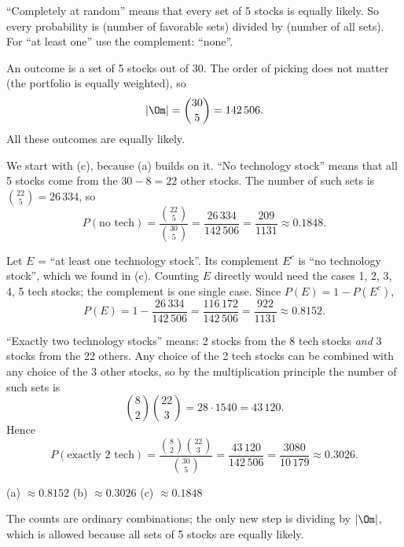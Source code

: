 \begin{solution}
	\idea ``Completely at random'' means that every set of 5 stocks is equally
	likely. So every probability is (number of favorable sets) divided by
	(number of all sets). For ``at least one'' use the complement: ``none''.

	 An outcome is a set of 5 stocks out of 30. The order of
	picking does not matter (the portfolio is equally weighted), so
	\[ |\Om|=\binom{30}{5}=142\,506. \]
	All these outcomes are equally likely.

	 We start with (c), because (a) builds on it. ``No technology
	stock'' means that all 5 stocks come from the $30-8=22$ other stocks. The
	number of such sets is $\binom{22}{5}=26\,334$, so
	\[ P(\text{no tech})=\frac{\binom{22}{5}}{\binom{30}{5}}
		=\frac{26\,334}{142\,506}=\frac{209}{1131}\approx0.1848. \]

	 Let $E$ = ``at least one technology stock''. Its complement
	$E^c$ is ``no technology stock'', which we found in (c). Counting $E$
	directly would need the cases 1, 2, 3, 4, 5 tech stocks; the complement is
	one single case. Since $P(E)=1-P(E^c)$,
	\[ P(E)=1-\frac{26\,334}{142\,506}=\frac{116\,172}{142\,506}=\frac{922}{1131}
		\approx0.8152. \]

	 ``Exactly two technology stocks'' means: 2 stocks from the 8
	tech stocks \emph{and} 3 stocks from the 22 others. Any choice of the 2
	tech stocks can be combined with any choice of the 3 other stocks, so by
	the multiplication principle the
	number of such sets is
	\[ \binom{8}{2}\binom{22}{3}=28\cdot1540=43\,120. \]
	Hence
	\[ P(\text{exactly 2 tech})=\frac{\binom{8}{2}\binom{22}{3}}{\binom{30}{5}}
		=\frac{43\,120}{142\,506}=\frac{3080}{10\,179}\approx0.3026. \]

	\begin{answer}
		(a) $\approx0.8152$ \quad (b) $\approx0.3026$ \quad (c) $\approx0.1848$
	\end{answer}
	\begin{remark}
		The counts are ordinary combinations; the only new step is dividing by
		$|\Om|$, which is allowed because all sets of 5 stocks are equally
		likely.
	\end{remark}
\end{solution}
